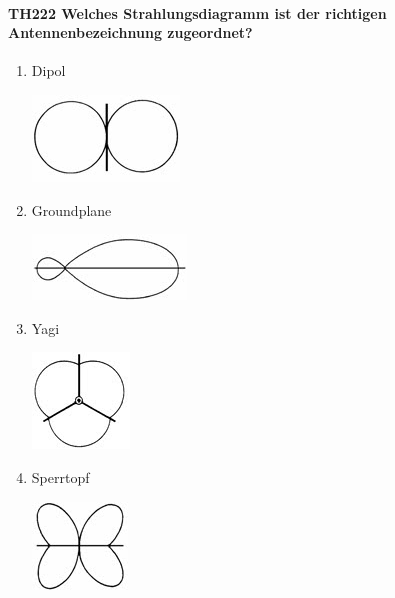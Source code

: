 \documentclass[8pt]{article}
\begin{document}
\paragraph*{TH222 Welches Strahlungsdiagramm ist der richtigen Antennenbezeichnung zugeordnet?}
\begin{enumerate}[nolistsep,label=\Alph*]
\item Dipol
\begin{center}
	\begin{minipage}{\linewidth}
		\centering
		\includegraphics[scale=1.0]{pics/th222_a.jpg}
	\end{minipage}
\end{center}
\item Groundplane
\begin{center}
	\begin{minipage}{\linewidth}
		\centering
		\includegraphics[scale=1.0]{pics/th222_b.jpg}
	\end{minipage}
\end{center}
\item Yagi
\begin{center}
	\begin{minipage}{\linewidth}
		\centering
		\includegraphics[scale=1.0]{pics/th222_c.jpg}
	\end{minipage}
\end{center}
\item Sperrtopf
\begin{center}
	\begin{minipage}{\linewidth}
		\centering
		\includegraphics[scale=1.0]{pics/th222_d.jpg}
	\end{minipage}
\end{center}
\end{enumerate}
\end{document}

